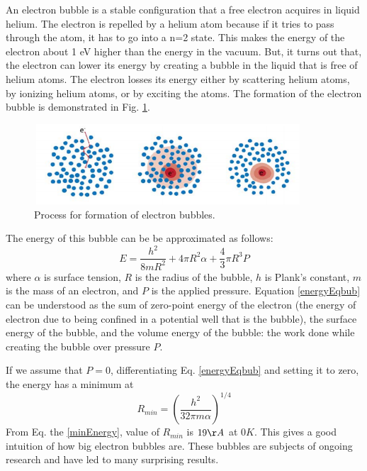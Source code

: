 An electron bubble is a stable configuration that a free electron acquires in liquid helium. \cite{Classen} The electron is repelled by a helium atom because if it tries to pass through the atom, it has to go into a n=2 state. This makes the energy of the electron about 1 eV higher than the energy in the vacuum. But, it turns out that, the electron can lower its energy by creating a bubble in the liquid that is free of helium atoms. The electron losses its energy either by scattering helium atoms, by ionizing helium atoms, or by exciting the atoms. The formation of the electron bubble is demonstrated in Fig. \ref{bubbleFormation}.
\begin{figure}[H]
\centering 
\includegraphics[width=100mm, height=30mm]{Introduction/bubbleFormation.png}
\caption{Process for formation of electron bubbles. \cite{Yang2018thesis}}
\label{bubbleFormation}
\end{figure}

The energy of this bubble can be be approximated as follows:
\begin{equation}\label{energyEqbub}
E=\frac{h^2}{8mR^2}+4\pi R^2\alpha + \frac{4}{3}\pi R^3 P
\end{equation}
where $\alpha$ is surface tension, $R$ is the radius of the bubble, $h$ is Plank's constant, $m$ is the mass of an electron, and $P$ is the applied pressure. Equation \ref{energyEqbub} can be understood as the sum of zero-point energy of the electron (the energy of electron due to being confined in a potential well that is the bubble), the surface energy of the bubble, and the volume energy of the bubble: the work done while creating the bubble over pressure $P$.  

If we assume that $P=0$, differentiating Eq. \ref{energyEqbub} and setting it to zero, the energy has a minimum at
\begin{equation}\label{minEnergy}
R_{min} = \left(\frac{h^2}{32\pi m \alpha}\right)^{1/4}
\end{equation} 
From Eq. the \ref{minEnergy}, value of $R_{min}$ is $19 \AA$ at $0K$. This gives a good intuition of how big electron bubbles are. These bubbles are subjects of ongoing research and have led to many surprising results. 

